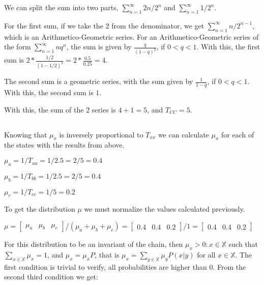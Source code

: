 \documentclass{article}
\begin{document}
We can split the sum into two parts, $\sum_{n=1}^{\infty} 2n / 2^n$ and $\sum_{n=1}^{\infty} 1 / 2^n$.

For the first sum, if we take the 2 from the denominator, we get $\sum_{n=1}^{\infty} n / 2^{n-1}$, which is an Arithmetico-Geometric series.
For an Arithmetico-Geometric series of the form $\sum_{n=1}^{\infty} nq^{n}$, the sum is given by $\frac{q}{(1 - q)^2}$, if $0 < q < 1$.
With this, the first sum is $ 2 * \frac{1/2}{(1 - 1/2)^2} = 2 * \frac{0.5}{0.25} = 4$.

The second sum is a geometric series, with the sum given by $\frac{1}{1 - q}$, if $0 < q < 1$.
With this, the second sum is $1$.

\bigskip

With this, the sum of the 2 series is $4 + 1 = 5$, and $T_{CC} = 5$.

\subsection{}

Knowing that $\mu_{x}$ is inversely proportional to $T_{xx}$ we can calculate $\mu_{x}$ for each of the states with the results from above.

\bigskip

$\mu_{a} = 1 / T_{aa} = 1 / 2.5 = 2 / 5 = 0.4$

$\mu_{b} = 1 / T_{bb} = 1 / 2.5 = 2 / 5 = 0.4$

$\mu_{c} = 1 / T_{cc} = 1 / 5 = 0.2$

\bigskip

To get the distribution $\mu$ we must normalize the values calculated previously.

\bigskip

$\mu = \begin{bmatrix} \mu_{a} & \mu_{b} & \mu_{c} \end{bmatrix} / (\mu_{a} + \mu_{b} + \mu_{c}) = \begin{bmatrix} 0.4 & 0.4 & 0.2 \end{bmatrix} / 1 = \begin{bmatrix} 0.4 & 0.4 & 0.2 \end{bmatrix}$

\bigskip

For this distribution to be an invariant of the chain, then $\mu_{x} > 0 : x \in \mathbb{X}$ such that $\sum_{x \in \mathbb{X}} \mu_{x} = 1$, and $\mu_{x} = \mu_{x}P$, that is $\mu_{x} = \sum_{y \in \mathbb{X}} \mu_{y}P(x | y)$ for all $x \in \mathbb{X}$.
The first condition is trivial to verify, all probabilities are higher than 0.
From the second third condition we get:
\end{document}
